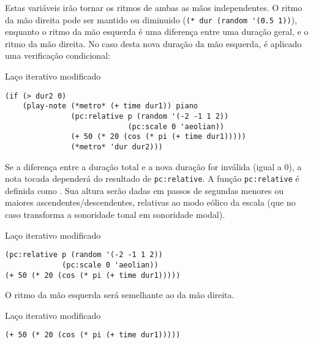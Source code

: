 Estas variáveis irão tornar os ritmos de ambas as mãos independentes. O ritmo da mão direita pode ser mantido ou diminuido (\verb|(* dur (random '(0.5 1))|), enquanto o ritmo da mão esquerda é uma diferença entre uma duração geral, e o ritmo da mão direita. No caso desta nova duração da mão esquerda, é aplicado uma verificação condicional:

\begin{example}{Laço iterativo modificado}
\begin{verbatim}
(if (> dur2 0)
    (play-note (*metro* (+ time dur1)) piano
               (pc:relative p (random '(-2 -1 1 2))
                            (pc:scale 0 'aeolian))
               (+ 50 (* 20 (cos (* pi (+ time dur1)))))
               (*metro* 'dur dur2)))
\end{verbatim}
\end{example}

Se a diferença entre a duração total e a nova duração for inválida (igual a $0$), a nota tocada dependerá do resultado de \verb|pc:relative|. A função \verb|pc:relative| é definida como . Sua altura serão dadas em passos de segundas menores ou maiores ascendentes/descendentes, relativas ao modo eólico da escala (que no caso transforma a sonoridade tonal em sonoridade modal). 

\begin{example}{Laço iterativo modificado}
\begin{verbatim}
(pc:relative p (random '(-2 -1 1 2))
             (pc:scale 0 'aeolian))
(+ 50 (* 20 (cos (* pi (+ time dur1)))))
\end{verbatim}
\end{example}

O ritmo da mão esquerda será semelhante ao da mão direita. 

\begin{example}{Laço iterativo modificado}
\begin{verbatim}
(+ 50 (* 20 (cos (* pi (+ time dur1)))))
\end{verbatim}
\end{example}

